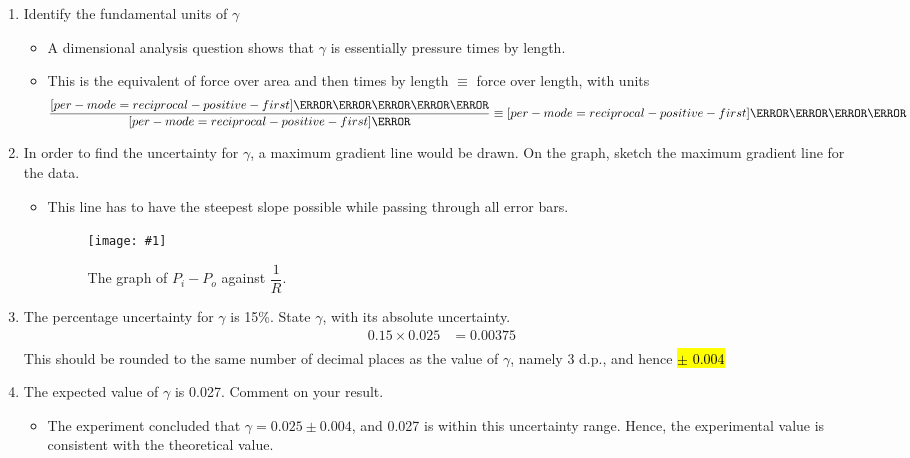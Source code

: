 \documentclass[a4paper,12pt]{article}
\DeclareRobustCommand{\hlans}[1]{{\sethlcolor{ForestGreen!30!white}\hl{#1}}}
\let\oldsi\si
\renewcommand{\si}[1]{\oldsi[per-mode=reciprocal-positive-first]{#1}}
\newcommand{\img}[4]{\begin{center}
  \begin{figure}[H]
    \centering
    \texttt{[image: \#1]}
    \caption{#3}
    \label{fig:#4}
  \end{figure}
\end{center}}
\begin{document}
\begin{enumerate}[label=(\alph*)]
\begin{enumerate}[label=(\roman*)]
\begin{itemize}
\begin{align*}
                          \gamma          & = \frac{0.1}{4}                     \\
                                          & = 0.025
                        \end{align*}
                \end{itemize}
          \item Identify the fundamental units of $\gamma$
                \begin{itemize}
                  \item A dimensional analysis question shows that $\gamma$ is essentially pressure times by length.
                  \item This is the equivalent of force over area and then times by length $\equiv$ force over length, with units $$\frac{\si{\kg\m\per\s\squared}}{\si{\m}}\equiv \si{\kg\per\s\squared}$$
                \end{itemize}
          \item In order to find the uncertainty for $\gamma$, a maximum gradient line would be drawn. On the graph, sketch the maximum gradient line for the data.
                \begin{itemize}
                  \item This line has to have the steepest slope possible while passing through all error bars.
                        \img{ex/8.png}{0.7}{The graph of $P_i - P_o$ against $\dfrac{1}{R}$.}{8}
                \end{itemize}
          \item The percentage uncertainty for $\gamma$ is 15\%. State $\gamma$, with its absolute uncertainty.
                \begin{align*}
                  0.15\times 0.025 & = 0.00375 \\
                \end{align*}
                This should be rounded to the same number of decimal places as the value of $\gamma$, namely 3 d.p., and hence \hlans{$\pm$ 0.004}
          \item The expected value of $\gamma$ is 0.027. Comment on your result.
                \begin{itemize}
                  \item The experiment concluded that $\gamma = 0.025 \pm 0.004$, and 0.027 is within this uncertainty range. Hence, the experimental value is consistent with the theoretical value.
                \end{itemize}
        \end{enumerate}
\end{enumerate}
\end{document}
